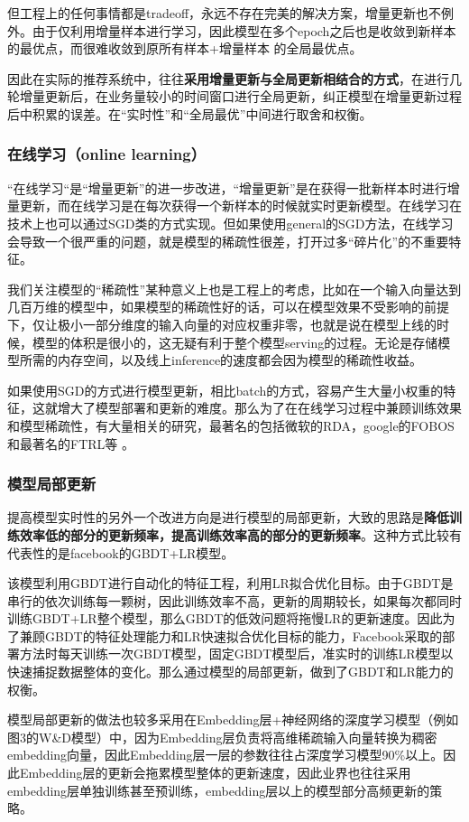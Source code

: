 \documentclass[12pt]{article}
\begin{document}
但工程上的任何事情都是tradeoff，永远不存在完美的解决方案，增量更新也不例外。由于仅利用增量样本进行学习，因此模型在多个epoch之后也是收敛到新样本的最优点，而很难收敛到原所有样本+增量样本 的全局最优点。

因此在实际的推荐系统中，往往\textbf{采用增量更新与全局更新相结合的方式}，在进行几轮增量更新后，在业务量较小的时间窗口进行全局更新，纠正模型在增量更新过程后中积累的误差。在“实时性”和“全局最优”中间进行取舍和权衡。

\subsubsection{在线学习（online learning）}
“在线学习“是“增量更新”的进一步改进，“增量更新”是在获得一批新样本时进行增量更新，而在线学习是在每次获得一个新样本的时候就实时更新模型。在线学习在技术上也可以通过SGD类的方式实现。但如果使用general的SGD方法，在线学习会导致一个很严重的问题，就是模型的稀疏性很差，打开过多“碎片化”的不重要特征。

我们关注模型的“稀疏性”某种意义上也是工程上的考虑，比如在一个输入向量达到几百万维的模型中，如果模型的稀疏性好的话，可以在模型效果不受影响的前提下，仅让极小一部分维度的输入向量的对应权重非零，也就是说在模型上线的时候，模型的体积是很小的，这无疑有利于整个模型serving的过程。无论是存储模型所需的内存空间，以及线上inference的速度都会因为模型的稀疏性收益。

如果使用SGD的方式进行模型更新，相比batch的方式，容易产生大量小权重的特征，这就增大了模型部署和更新的难度。那么为了在在线学习过程中兼顾训练效果和模型稀疏性，有大量相关的研究，最著名的包括微软的RDA，google的FOBOS和最著名的FTRL等 。

\subsubsection{模型局部更新}
提高模型实时性的另外一个改进方向是进行模型的局部更新，大致的思路是\textbf{降低训练效率低的部分的更新频率，提高训练效率高的部分的更新频率}。这种方式比较有代表性的是facebook的GBDT+LR模型。

该模型利用GBDT进行自动化的特征工程，利用LR拟合优化目标。由于GBDT是串行的依次训练每一颗树，因此训练效率不高，更新的周期较长，如果每次都同时训练GBDT+LR整个模型，那么GBDT的低效问题将拖慢LR的更新速度。因此为了兼顾GBDT的特征处理能力和LR快速拟合优化目标的能力，Facebook采取的部署方法时每天训练一次GBDT模型，固定GBDT模型后，准实时的训练LR模型以快速捕捉数据整体的变化。那么通过模型的局部更新，做到了GBDT和LR能力的权衡。

模型局部更新的做法也较多采用在Embedding层+神经网络的深度学习模型（例如图3的W\&D模型）中，因为Embedding层负责将高维稀疏输入向量转换为稠密embedding向量，因此Embedding层一层的参数往往占深度学习模型90\%以上。因此Embedding层的更新会拖累模型整体的更新速度，因此业界也往往采用embedding层单独训练甚至预训练，embedding层以上的模型部分高频更新的策略。
\end{document}

